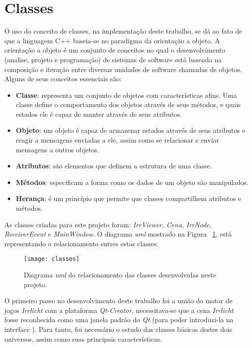 \section{Classes}
	O uso do conceito de classes, na implementação deste trabalho, se dá ao fato de que a linguagem C++ baseia-se no paradigma da orientação a objeto. A orientação a objeto é um conjunto de conceitos no qual o desenvolvimento (analise, projeto e programação) de sistemas de software está baseada na composição e iteração entre diversas unidades de software chamadas de objetos. Alguns de seus conceitos essenciais são:

\begin{itemize}
	\item \textbf{Classe}: representa um conjunto de objetos com características afins. Uma classe define o comportamento dos objetos através de seus métodos, e quais estados ele é capaz de manter através de seus atributos.
	\item \textbf{Objeto}: um objeto é capaz de armazenar estados através de seus atributos e reagir a mensagens enviadas a ele, assim como se relacionar e enviar mensagens a outros objetos.
	\item \textbf{Atributos}: são elementos que definem a estrutura de uma classe.
	\item \textbf{Métodos}: especificam a forma como os dados de um objeto são manipulados.
	\item \textbf{Herança}: é um princípio que permite que classes compartilhem atributos e métodos.
\end{itemize}

	As classes criadas para este projeto foram: \textit{IrrViewer, Cena, IrrNode, ReceiverEvent} e \textit{MainWindow}. O diagrama \textit{uml} mostrado na Figura ~\ref{fg:classes}, está representando o relacionamento entres estas classes.

\begin{figure}[ht!]
	\centering
	\texttt{[image: classes]}
	\caption{Diagrama \textit{uml} do relacionamento das classes desenvolvidas neste projeto.}
	\label{fg:classes}
\end{figure} 

	O primeiro passo no desenvolvimento deste trabalho foi a união do motor de jogos \textit{Irrlicht} com a plataforma \textit{Qt-Creator}, necessitava-se que a cena \textit{Irrlicht} fosse reconhecida como uma janela padrão do \textit{Qt} (para poder introduzi-la na interface ). Para tanto, foi necessário o estudo das classes básicas destes dois universos, assim como suas principais características. 

